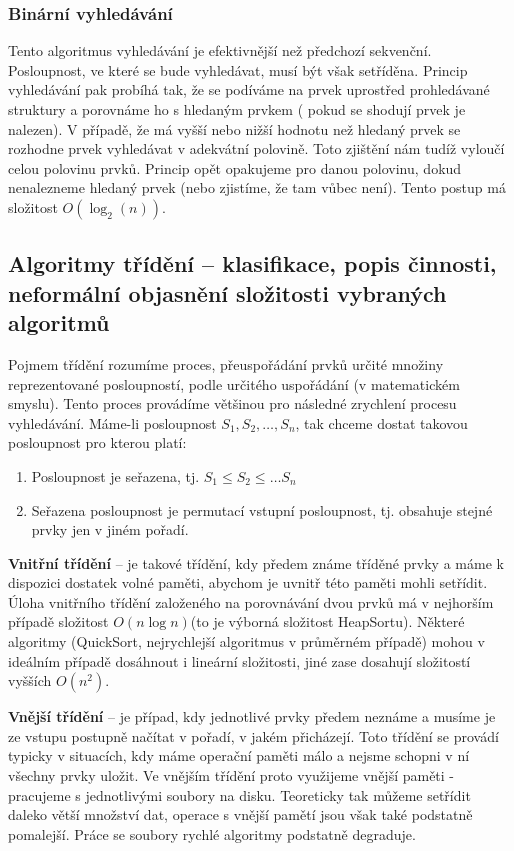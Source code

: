 \subsubsection{Binární vyhledávání}
Tento algoritmus vyhledávání je efektivnější než předchozí sekvenční. Posloupnost, ve které se bude vyhledávat, musí být však setříděna.  Princip vyhledávání pak probíhá tak, že se podíváme na prvek uprostřed prohledávané struktury a porovnáme ho s hledaným prvkem ( pokud se shodují prvek je nalezen). V případě, že má vyšší nebo nižší hodnotu než hledaný prvek se rozhodne prvek vyhledávat v adekvátní polovině. Toto zjištění nám tudíž vyloučí celou polovinu prvků. Princip opět opakujeme pro danou polovinu, dokud nenalezneme hledaný prvek (nebo zjistíme, že tam vůbec není). Tento postup má složitost $O(\log_2 (n))$.
\subsection[Algoritmy třídění]{Algoritmy třídění – klasifikace, popis činnosti, neformální objasnění složitosti vybraných algoritmů}
Pojmem třídění rozumíme proces, přeuspořádání prvků určité množiny reprezentované posloupností, podle určitého uspořádání (v matematickém smyslu). Tento proces provádíme většinou pro následné zrychlení procesu vyhledávání. Máme-li posloupnost $S_1,S_2,\ldots ,S_n$, tak chceme dostat takovou posloupnost pro kterou platí:
\begin{enumerate}
\item Posloupnost je seřazena, tj. $S_1 \leq S_2 \leq \ldots S_n$
\item Seřazena posloupnost je permutací vstupní posloupnost, tj. obsahuje stejné prvky jen v jiném pořadí.
\end{enumerate}

\textbf{Vnitřní třídění} -- je takové třídění, kdy předem známe tříděné prvky a máme k dispozici dostatek volné paměti, abychom je uvnitř této paměti mohli setřídit. Úloha vnitřního třídění založeného na porovnávání dvou prvků má v nejhorším případě složitost $O(n \log n)$(to je výborná složitost HeapSortu). 
Některé algoritmy (QuickSort, nejrychlejší algoritmus v průměrném případě) mohou v ideálním případě dosáhnout i lineární složitosti, jiné zase dosahují složitostí vyšších $O(n^2)$.

\textbf{Vnější třídění} -- je případ, kdy jednotlivé prvky předem neznáme a musíme je ze vstupu postupně načítat v pořadí, v jakém přicházejí. Toto třídění se provádí typicky v situacích, kdy máme operační paměti málo a nejsme schopni v ní všechny prvky uložit. Ve vnějším třídění proto využijeme vnější paměti - pracujeme s jednotlivými soubory na disku. Teoreticky tak můžeme setřídit daleko větší množství dat, operace s vnější pamětí jsou však také podstatně pomalejší. Práce se soubory rychlé algoritmy podstatně degraduje.

